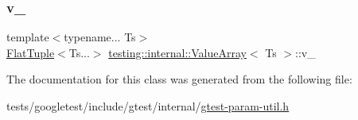 \subsubsection{\texorpdfstring{v\+\_\+}{v\_}}
{\footnotesize\ttfamily template$<$typename... Ts$>$ \\
\hyperlink{classtesting_1_1internal_1_1FlatTuple}{Flat\+Tuple}$<$Ts...$>$ \hyperlink{classtesting_1_1internal_1_1ValueArray}{testing\+::internal\+::\+Value\+Array}$<$ Ts $>$\+::v\+\_\+\hspace{0.3cm}{\ttfamily [private]}}



The documentation for this class was generated from the following file\+:\begin{DoxyCompactItemize}
\item 
tests/googletest/include/gtest/internal/\hyperlink{gtest-param-util_8h}{gtest-\/param-\/util.\+h}\end{DoxyCompactItemize}
